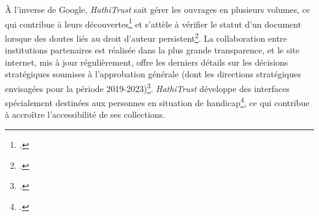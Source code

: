 À l'inverse de Google, \textit{HathiTrust} sait gérer les ouvrages en plusieurs volumes, ce qui contribue à leurs découvertes\footcite{weiss_examining_2016} et s'attèle à vérifier le statut d'un document lorsque des doutes liés au droit d'auteur persistent\footcite{weiss_examining_2016}. La collaboration entre institutions partenaires est réalisée dans la plus grande transparence, et le site internet, mis à jour régulièrement, offre les derniers détails sur les décisions stratégiques soumises à l'approbation générale (dont les directions stratégiques envisagées pour la période 2019-2023)\footcite{hathitrust_digital_library_charting_nodate}. \textit{HathiTrust} développe des interfaces spécialement destinées aux personnes en situation de handicap\footcite{hathitrust_digital_library_charting_nodate}, ce qui contribue à accroître l'accessibilité de ses collections.
\newpage

